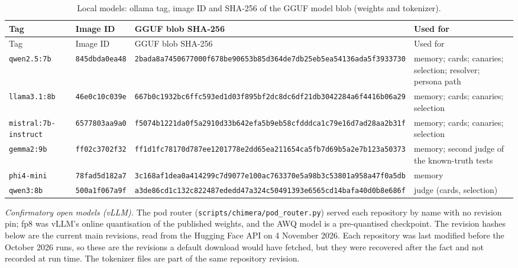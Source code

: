 \documentclass[11pt]{article}
\begin{document}
{\scriptsize\begin{longtable}{p{2.8cm}p{1.8cm}p{4.9cm}p{4.7cm}}
\caption{Local models: ollama tag, image ID and SHA-256 of the GGUF model blob (weights and tokenizer).}\label{tab:s-ollama}\\
\toprule Tag & Image ID & GGUF blob SHA-256 & Used for \\ \midrule \endfirsthead \toprule Tag & Image ID & GGUF blob SHA-256 & Used for \\ \midrule \endhead
\texttt{qwen2.5:7b} & \texttt{845dbda0ea48} & \texttt{2bada8a7450677000f678be90653b85d}\newline\texttt{364de7db25eb5ea54136ada5f3933730} & memory; cards; canaries; selection; resolver; persona path \\
\texttt{llama3.1:8b} & \texttt{46e0c10c039e} & \texttt{667b0c1932bc6ffc593ed1d03f895bf2}\newline\texttt{dc8dc6df21db3042284a6f4416b06a29} & memory; cards; canaries; selection \\
\texttt{mistral:7b-instruct} & \texttt{6577803aa9a0} & \texttt{f5074b1221da0f5a2910d33b642efa5b}\newline\texttt{9eb58cfdddca1c79e16d7ad28aa2b31f} & memory; cards; canaries; selection \\
\texttt{gemma2:9b} & \texttt{ff02c3702f32} & \texttt{ff1d1fc78170d787ee1201778e2dd65e}\newline\texttt{a211654ca5fb7d69b5a2e7b123a50373} & memory; second judge of the known-truth tests \\
\texttt{phi4-mini} & \texttt{78fad5d182a7} & \texttt{3c168af1dea0a414299c7d9077e100ac}\newline\texttt{763370e5a98b3c53801a958a47f0a5db} & memory \\
\texttt{qwen3:8b} & \texttt{500a1f067a9f} & \texttt{a3de86cd1c132c822487ededd47a324c}\newline\texttt{50491393e6565cd14bafa40d0b8e686f} & judge (cards, selection) \\
\bottomrule\end{longtable}}
\emph{Confirmatory open models (vLLM).} The pod router (\nolinkurl{scripts/chimera/pod_router.py}) served each repository by name with no revision pin; fp8 was vLLM's online quantisation of the published weights, and the AWQ model is a pre-quantised checkpoint. The revision hashes below are the current main revisions, read from the Hugging Face API on 4 November 2026. Each repository was last modified before the October 2026 runs, so these are the revisions a default download would have fetched, but they were recovered after the fact and not recorded at run time. The tokenizer files are part of the same repository revision.
\end{document}
